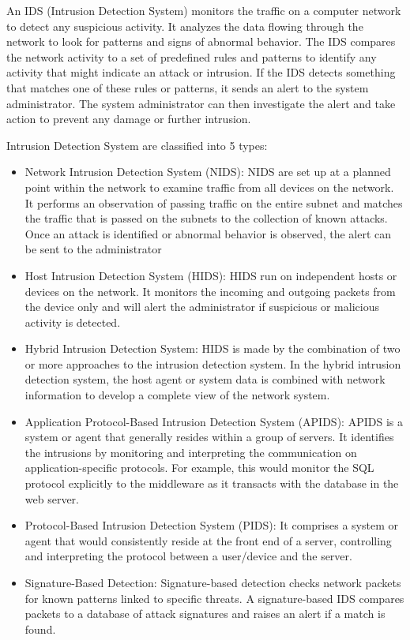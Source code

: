 An IDS (Intrusion Detection System) monitors the traffic on a computer network to detect any suspicious activity.
It analyzes the data flowing through the network to look for patterns and signs of abnormal behavior.
The IDS compares the network activity to a set of predefined rules and patterns to identify any activity that might indicate an attack or intrusion.
If the IDS detects something that matches one of these rules or patterns, it sends an alert to the system administrator.
The system administrator can then investigate the alert and take action to prevent any damage or further intrusion.

 Intrusion Detection System are classified into 5 types:
 \begin{itemize}
    \item Network Intrusion Detection System (NIDS): NIDS are set up at a planned point within the network to examine traffic from all devices on the network. 
    It performs an observation of passing traffic on the entire subnet and matches the traffic that is passed on the subnets to the collection of known attacks.
    Once an attack is identified or abnormal behavior is observed, the alert can be sent to the administrator
    \item Host Intrusion Detection System (HIDS): HIDS run on independent hosts or devices on the network.
    It monitors the incoming and outgoing packets from the device only and will alert the administrator if suspicious or malicious activity is detected.
    \item Hybrid Intrusion Detection System: HIDS is made by the combination of two or more approaches to the intrusion detection system. 
    In the hybrid intrusion detection system, the host agent or system data is combined with network information to develop a complete view of the network system.
    \item Application Protocol-Based Intrusion Detection System (APIDS): APIDS is a system or agent that generally resides within a group of servers. 
    It identifies the intrusions by monitoring and interpreting the communication on application-specific protocols. 
    For example, this would monitor the SQL protocol explicitly to the middleware as it transacts with the database in the web server.
    \item Protocol-Based Intrusion Detection System (PIDS):  It comprises a system or agent that would consistently reside at the front end of a server, controlling and interpreting the protocol between a user/device and the server.
    \item Signature-Based Detection: Signature-based detection checks network packets for known patterns linked to specific threats. A signature-based IDS compares packets to a database of attack signatures and raises an alert if a match is found.
 \end{itemize}

